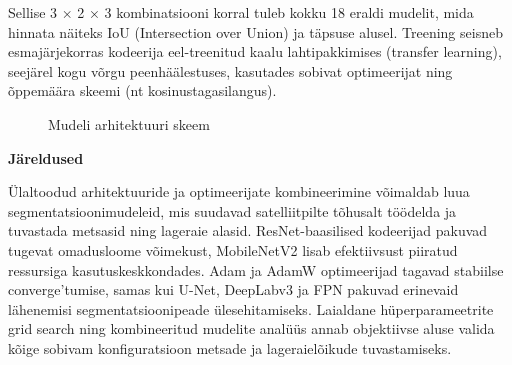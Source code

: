 Sellise 3 × 2 × 3 kombinatsiooni korral tuleb kokku 18 eraldi mudelit, mida hinnata näiteks IoU (Intersection over Union) ja täpsuse alusel. Treening seisneb esmajärjekorras kodeerija eel-treenitud kaalu lahtipakkimises (transfer learning), seejärel kogu võrgu peenhäälestuses, kasutades sobivat optimeerijat ning õppemäära skeemi (nt kosinustagasilangus).


\begin{figure}
    \centering
    \caption{Mudeli arhitektuuri skeem}
    \label{fig:model_architecture}
\end{figure}

\textbf{Järeldused}

Ülaltoodud arhitektuuride ja optimeerijate kombineerimine võimaldab luua segmentatsioonimudeleid, mis suudavad satelliitpilte tõhusalt töödelda ja tuvastada metsasid ning lageraie alasid. ResNet-baasilised kodeerijad pakuvad tugevat omadusloome võimekust, MobileNetV2 lisab efektiivsust piiratud ressursiga kasutuskeskkondades. Adam ja AdamW optimeerijad tagavad stabiilse converge’tumise, samas kui U-Net, DeepLabv3 ja FPN pakuvad erinevaid lähenemisi segmentatsioonipeade ülesehitamiseks. Laialdane hüperparameetrite grid search ning kombineeritud mudelite analüüs annab objektiivse aluse valida kõige sobivam konfiguratsioon metsade ja lageraielõikude tuvastamiseks.

